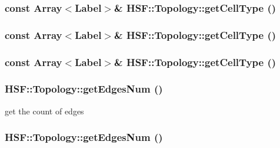 \hypertarget{classHSF_1_1Topology_a1450bccac8167a83983fc8e91a1a68cf}{
\subsubsection[{getCellType}]{\setlength{\rightskip}{0pt plus 5cm}const Array$<${\bf Label}$>$\& HSF::Topology::getCellType ()}}
\label{classHSF_1_1Topology_a1450bccac8167a83983fc8e91a1a68cf}
\hypertarget{classHSF_1_1Topology_a1450bccac8167a83983fc8e91a1a68cf}{
\subsubsection[{getCellType}]{\setlength{\rightskip}{0pt plus 5cm}const Array$<${\bf Label}$>$\& HSF::Topology::getCellType ()}}
\label{classHSF_1_1Topology_a1450bccac8167a83983fc8e91a1a68cf}
\hypertarget{classHSF_1_1Topology_a1450bccac8167a83983fc8e91a1a68cf}{
\subsubsection[{getCellType}]{\setlength{\rightskip}{0pt plus 5cm}const Array$<${\bf Label}$>$\& HSF::Topology::getCellType ()}}
\label{classHSF_1_1Topology_a1450bccac8167a83983fc8e91a1a68cf}
\hypertarget{classHSF_1_1Topology_aacb3bbf08010f13016ac3db329f18bb8}{
\subsubsection[{getEdgesNum}]{ HSF::Topology::getEdgesNum ()}}
\label{classHSF_1_1Topology_aacb3bbf08010f13016ac3db329f18bb8}


get the count of edges \hypertarget{classHSF_1_1Topology_aacb3bbf08010f13016ac3db329f18bb8}{
\subsubsection[{getEdgesNum}]{ HSF::Topology::getEdgesNum ()}}
\label{classHSF_1_1Topology_aacb3bbf08010f13016ac3db329f18bb8}


